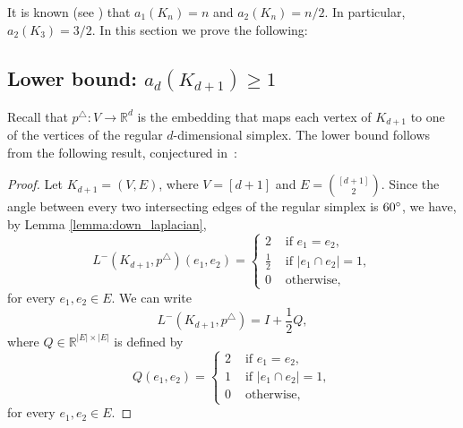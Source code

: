 \documentclass[a4paper,11pt]{article}
\theoremstyle{plain}
\theoremstyle{definition}
\newcommand{\Rea}{{\mathbb R}}
\begin{document}
It is known (see \cite{jordan2020rigidity}) that $a_1(K_{n})=n$ and $a_2(K_n)=n/2$. In particular, $a_2(K_3)=3/2$. In this section we prove the following:

\connectivityofsimplex*

\subsection{Lower bound: $a_d(K_{d+1})\ge 1$}

Recall that $p^{\triangle}:V\to \Rea^d$ is the embedding that maps each vertex of $K_{d+1}$ to one of the vertices of the regular $d$-dimensional simplex.
The lower bound follows from the following result, conjectured in~\cite[Conj.1]{jordan2020rigidity}:

\simplexspectrum*
\begin{proof}
Let $K_{d+1}=(V,E)$, where $V=[d+1]$ and $E=\binom{[d+1]}{2}$. Since the angle between every two intersecting edges of the regular simplex is $60\degree$, we have, by Lemma \ref{lemma:down_laplacian},
\[
    L^{-}(K_{d+1},p^{\triangle})(e_1,e_2)= \begin{cases}
                    2 & \text{ if } e_1=e_2,\\
                    \frac{1}{2} & \text{ if } |e_1\cap e_2|=1,\\
                    0 & \text{ otherwise,}
                    \end{cases} 
\]
for every $e_1,e_2\in E$. We can write
\[
    L^{-}(K_{d+1},p^{\triangle})= I+ \frac{1}{2} Q,
\]
where $Q\in \Rea^{|E|\times|E|}$ is defined by
\[
    Q(e_1,e_2)= \begin{cases}
                    2 & \text{ if } e_1=e_2,\\
                   1 & \text{ if } |e_1\cap e_2|=1,\\
                    0 & \text{ otherwise,}
                    \end{cases} 
\]
for every $e_1,e_2\in E$. 


\end{proof}
\end{document}
